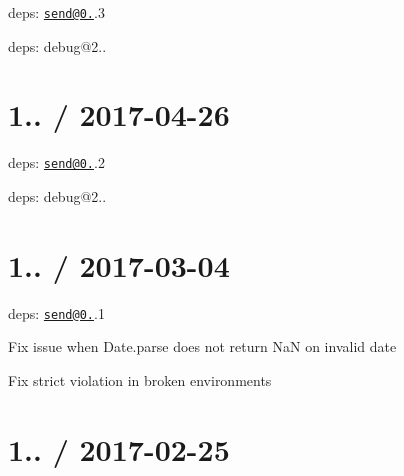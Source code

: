 
\begin{DoxyItemize}
\item deps\+: \href{mailto:send@0.15}{\tt send@0.}.3
\begin{DoxyItemize}
\item deps\+: debug@2..
\end{DoxyItemize}
\end{DoxyItemize}

\section*{1.. / 2017-\/04-\/26 }


\begin{DoxyItemize}
\item deps\+: \href{mailto:send@0.15}{\tt send@0.}.2
\begin{DoxyItemize}
\item deps\+: debug@2..
\end{DoxyItemize}
\end{DoxyItemize}

\section*{1.. / 2017-\/03-\/04 }


\begin{DoxyItemize}
\item deps\+: \href{mailto:send@0.15}{\tt send@0.}.1
\begin{DoxyItemize}
\item Fix issue when {\ttfamily Date.\+parse} does not return {\ttfamily NaN} on invalid date
\item Fix strict violation in broken environments
\end{DoxyItemize}
\end{DoxyItemize}

\section*{1.. / 2017-\/02-\/25 }


